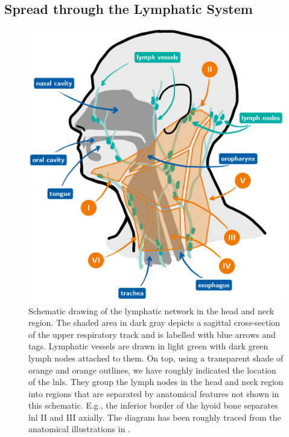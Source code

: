 \documentclass[\relativeRoot/main.tex]{subfiles}
\begin{document}
\subsection*{Spread through the Lymphatic System}
\label{subsec:intro:hnscc:lymph_spread}

\begin{figure}
    \centering
    \includegraphics[width=\textwidth]{figures/head_and_neck_labelled.png}
    \caption[
        Schematic drawing of the head and neck region.
    ]{
        Schematic drawing of the lymphatic network in the head and neck region. The shaded area in dark gray depicts a sagittal cross-section of the upper respiratory track and is labelled with blue arrows and tags. Lymphatic vessels are drawn in light green with dark green lymph nodes attached to them. On top, using a transparent shade of orange and orange outlines, we have roughly indicated the location of the \glspl{lnl}. They group the lymph nodes in the head and neck region into regions that are separated by anatomical features not shown in this schematic. E.g., the inferior border of the hyoid bone separates \gls{lnl} II and III axially. The diagram has been roughly traced from the anatomical illustrations in .
    }
    \label{fig:intro:schematics_head}
\end{figure}
\end{document}
